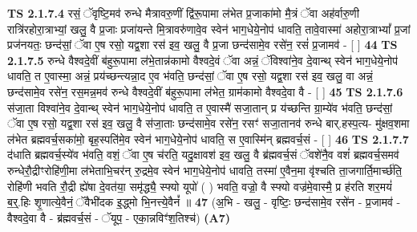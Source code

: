 \documentclass[17pt]{extarticle}
\begin{document}
                  \newline
                                \textbf{ TS 2.1.7.4} \newline
                  रसं॒ ॅवृष्टि॒मव॑ रुन्धे मैत्रावरु॒णीं द्वि॑रू॒पामा ल॑भेत प्र॒जाका॑मो मै॒त्रं ॅवा अह॑र्वारु॒णी रात्रि॑रहोरा॒त्राभ्यां॒ खलु॒ वै प्र॒जाः प्रजा॑यन्ते मि॒त्रावरु॑णावे॒व स्वेन॑ भाग॒धेये॒नोप॑ धावति॒ तावे॒वास्मा॑ अहोरा॒त्राभ्यां᳚ प्र॒जां प्रज॑नयतः॒ छन्द॑सां॒ ॅवा ए॒ष रसो॒ यद्व॒शा रस॑ इव॒ खलु॒ वै प्र॒जा छन्द॑सामे॒व रसे॑न॒ रसं॑ प्र॒जामव॑ - [  ] \textbf{  44} \newline
                  \newline
                                \textbf{ TS 2.1.7.5} \newline
                  रुन्धे वैश्वदे॒वीं ब॑हुरू॒पामा ल॑भे॒तान्न॑कामो वैश्वदे॒वं ॅवा अन्नं॒ ॅविश्वा॑ने॒व दे॒वान्थ् स्वेन॑ भाग॒धेये॒नोप॑ धावति॒ त ए॒वास्मा॒ अन्नं॒  प्रय॑च्छन्त्यन्ना॒द ए॒व भ॑वति॒ छन्द॑सां॒ ॅवा ए॒ष रसो॒ यद्व॒शा रस॑ इव॒ खलु॒ वा अन्नं॒ छन्द॑सामे॒व रसे॑न॒ रस॒मन्न॒मव॑ रुन्धे वैश्वदे॒वीं ब॑हुरू॒पामा ल॑भेत॒ ग्राम॑कामो वैश्वदे॒वा वै - [  ] \textbf{  45} \newline
                  \newline
                                \textbf{ TS 2.1.7.6} \newline
                  स॑जा॒ता विश्वा॑ने॒व दे॒वान्थ् स्वेन॑ भाग॒धेये॒नोप॑ धावति॒ त ए॒वास्मै॑ सजा॒तान् प्र य॑च्छन्ति ग्रा॒म्ये॑व भ॑वति॒ छन्द॑सां॒ ॅवा ए॒ष रसो॒ यद्व॒शा रस॑ इव॒ खलु॒ वै स॑जा॒ताः छन्द॑सामे॒व रसे॑न॒ रसꣳ॑ सजा॒तानव॑ रुन्धे बार्.हस्प॒त्य- मु॑क्षव॒शमा ल॑भेत ब्रह्मवर्च॒सका॑मो॒ बृह॒स्पति॑मे॒व स्वेन॑ भाग॒धेये॒नोप॑ धावति॒ स ए॒वास्मि॑न् ब्रह्मवर्च॒सं - [  ] \textbf{  46} \newline
                  \newline
                                \textbf{ TS 2.1.7.7} \newline
                  द॑धाति ब्रह्मवर्च॒स्ये॑व भ॑वति॒ वशं॒ ॅवा ए॒ष च॑रति॒ यदु॒क्षावश॑ इव॒ खलु॒ वै ब्र॑ह्मवर्च॒सं ॅवशे॑नै॒व वशं॑ ब्रह्मवर्च॒समव॑ रुन्धेरौ॒द्रीꣳरोहि॑णी॒मा ल॑भेताभि॒चर॑न् रु॒द्रमे॒व स्वेन॑ भाग॒धेये॒नोप॑ धावति॒ तस्मा॑ ए॒वैन॒मा वृ॑श्चति ता॒जगार्ति॒मार्च्छ॑ति॒ रोहि॑णी भवति रौ॒द्री ह्ये॑षा दे॒वत॑या॒ समृ॑द्ध्यै॒ स्फ्यो यूपो॑ ( ) भवति॒ वज्रो॒ वै स्फ्यो वज्र॑मे॒वास्मै॒ प्र ह॑रति शर॒मयं॑ ब॒र्॒.हिः शृ॒णात्ये॒वैनं॒ ॅवैभी॑दक इ॒द्ध्मो भि॒नत्त्ये॒वैनं᳚ ॥ \textbf{  47} \newline
                  \newline
                      (अ॒भि - खलु॒ - वृष्टिः॒ छन्द॑सामे॒व रसे॑न - प्र॒जामव॑ - वैश्वदे॒वा वै - ब्र॑ह्मवर्च॒सं - ॅयूप॒ - एका॒न्नविꣳ॑श॒तिश्च॑)  \textbf{(A7)} \newline \newline
\end{document}
